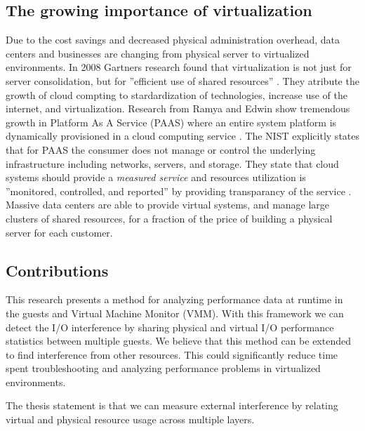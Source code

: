 \subsection{The growing importance of virtualization}
Due to the cost savings and decreased physical administration overhead, data centers and businesses are changing from physical server to virtualized environments. In 2008 Gartners research found that virtualization is not just for server consolidation, but for ”efficient use of shared resources” \cite{gartners}.  They atribute the growth of cloud compting to stardardization of technologies, increase use of the internet, and virtualization.  Research from Ramya and Edwin show tremendous growth in Platform As A Service (PAAS) where an entire system platform is dynamically provisioned in a cloud computing service \cite{ramya}. The NIST explicitly states that for PAAS the consumer does not manage or control the underlying infrastructure including networks, servers, and storage. They state that cloud systems should provide a \emph{measured service} and resources utilization is ”monitored, controlled, and reported” by providing transparancy of the service \cite{nist}.  Massive data centers are able to provide virtual systems, and manage large clusters of shared resources, for a fraction of the price of building a physical server for each customer.

\subsection{Contributions}
This research presents a method for analyzing performance data at runtime in the guests and Virtual Machine Monitor (VMM).   With this framework we can detect the I/O interference by sharing physical and virtual I/O performance statistics between multiple guests.  We believe that this method can be extended to find interference from other resources.  This could significantly reduce time spent troubleshooting and analyzing performance problems in virtualized environments.
\newline

The thesis statement is that we can measure external interference by relating virtual and physical resource usage across multiple layers.
\newline

